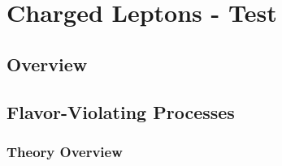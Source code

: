 %

\chapter{Charged Leptons - Test}
\label{chap:charged-leptons}


\begin{center}\begin{boldmath}






\end{boldmath}\end{center}

\makeatletter
\renewcommand{\paragraph}{\@startsection{paragraph}{4}{0ex}%
   {-3.25ex plus -1ex minus -0.2ex}%
   {1.5ex plus 0.2ex}%
   {\normalfont\normalsize\bfseries}}
\makeatother



\tableofcontents

\section{Overview}\label{sec:cl:over}


\section{Flavor-Violating Processes}\label{sec:cl:fv}

\subsection{Theory Overview}\label{sec:cl:fvt}


